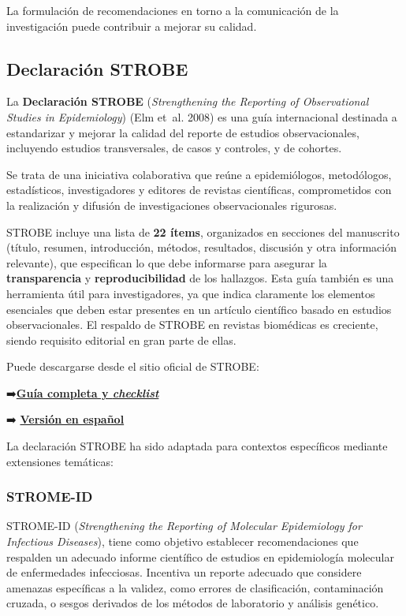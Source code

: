 \documentclass[
  spanish,
  a4paper,
]{scrbook}
\begin{document}
La formulación de recomendaciones en torno a la comunicación de la
investigación puede contribuir a mejorar su calidad.

\subsection{Declaración STROBE}\label{declaraciuxf3n-strobe}

La \textbf{Declaración STROBE} (\emph{Strengthening the Reporting of
Observational Studies in Epidemiology}) (Elm et~al. 2008) es una guía
internacional destinada a estandarizar y mejorar la calidad del reporte
de estudios observacionales, incluyendo estudios transversales, de casos
y controles, y de cohortes.

Se trata de una iniciativa colaborativa que reúne a epidemiólogos,
metodólogos, estadísticos, investigadores y editores de revistas
científicas, comprometidos con la realización y difusión de
investigaciones observacionales rigurosas.

STROBE incluye una lista de \textbf{22 ítems}, organizados en secciones
del manuscrito (título, resumen, introducción, métodos, resultados,
discusión y otra información relevante), que especifican lo que debe
informarse para asegurar la \textbf{transparencia} y
\textbf{reproducibilidad} de los hallazgos. Esta guía también es una
herramienta útil para investigadores, ya que indica claramente los
elementos esenciales que deben estar presentes en un artículo científico
basado en estudios observacionales. El respaldo de STROBE en revistas
biomédicas es creciente, siendo requisito editorial en gran parte de
ellas.

Puede descargarse desde el sitio oficial de STROBE:

➡\textbf{️\href{https://www.strobe-statement.org/strobe-publications/}{Guía
completa y \emph{checklist}}}

➡️
\href{https://www.strobe-statement.org/download/spanish-translation-of-strobe-statement}{\textbf{Versión
en español}}

La declaración STROBE ha sido adaptada para contextos específicos
mediante extensiones temáticas:

\subsubsection{STROME-ID}\label{strome-id}

STROME-ID (\emph{Strengthening the Reporting of Molecular Epidemiology
for Infectious Diseases}), tiene como objetivo establecer
recomendaciones que respalden un adecuado informe científico de estudios
en epidemiología molecular de enfermedades infecciosas. Incentiva un
reporte adecuado que considere amenazas específicas a la validez, como
errores de clasificación, contaminación cruzada, o sesgos derivados de
los métodos de laboratorio y análisis genético.
\end{document}
